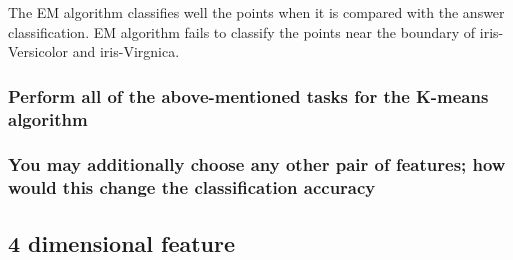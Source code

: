 \documentclass[a4paper]{article}
\begin{document}
\begin{itemize}
	The EM algorithm classifies well the points when it is compared with the answer classification. EM algorithm fails to classify the points near the boundary of iris-Versicolor and iris-Virgnica.
	\end{itemize}

	\subsubsection{Perform all of the above-mentioned tasks for the K-means algorithm}
	\subsubsection{You may additionally choose any other pair of features; how would this change the classiﬁcation accuracy}

	\subsection{4 dimensional feature}
\end{document}
